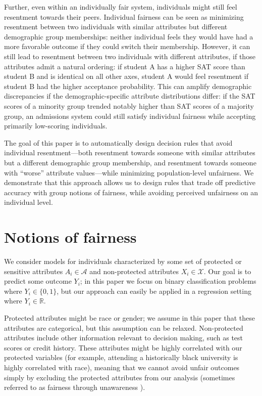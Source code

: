     Further, even within an individually fair system, individuals might still feel resentment towards their peers. Individual fairness can be seen as minimizing resentment between two individuals with similar attributes but different demographic group memberships: neither individual feels they would have had a more favorable outcome if they could switch their membership. However, it can still lead to resentment between two individuals with different attributes, if those attributes admit a natural ordering: if student A has a higher SAT score than student B and is identical on all other axes, student A would feel resentment if student B had the higher acceptance probability. This can amplify demographic discrepancies if the demographic-specific attribute distributions differ: if the SAT scores of a minority group trended notably higher than SAT scores of a majority group, an admissions system could still satisfy individual fairness while accepting primarily low-scoring individuals.

    The goal of this paper is to automatically design decision rules that avoid individual resentment---both resentment towards someone with similar attributes but a different demographic group membership, and resentment towards someone with ``worse'' attribute values---while minimizing population-level unfairness. We demonstrate that this approach allows us to design rules that trade off predictive accuracy with group notions of fairness, while avoiding perceived unfairness on an individual level.

\section{Notions of fairness}\label{sec:bg}
    \label{sec:monofair_background}
    
    We consider models for individuals characterized by some set of protected or sensitive attributes $A_i \in \mathcal{A}$ and non-protected attributes $X_i \in \mathcal{X}$. Our goal is to predict some outcome $Y_i$; in this paper we focus on binary classification problems where $Y_i \in \{0, 1\}$, but our approach can easily be applied in a regression setting where $Y_i\in \mathbb{R}$.

    Protected attributes might be race or gender; we assume in this paper that these attributes are categorical, but this assumption can be relaxed. Non-protected attributes include other information relevant to decision making, such as test scores or credit history. These attributes might be highly correlated with our protected variables (for example, attending a historically black university is highly correlated with race), meaning that we cannot avoid unfair outcomes simply by excluding the protected attributes from our analysis (sometimes referred to as fairness through unawareness \citep{dwork2012fairness}).

